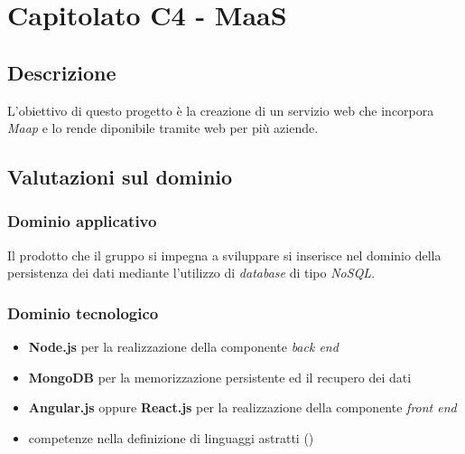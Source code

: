 \section{Capitolato C4 - MaaS}

\subsection{Descrizione}
L'obiettivo di questo progetto \`e la creazione di un servizio web che incorpora \textit{Maap} e lo rende diponibile
tramite web per pi\`u aziende.

\subsection{Valutazioni sul dominio}
\subsubsection{Dominio applicativo}
Il prodotto che il gruppo si impegna a sviluppare si inserisce nel dominio della persistenza dei dati
mediante l'utilizzo di \textit{database} %
di tipo \textit{NoSQL}. %

\subsubsection{Dominio tecnologico}
\begin{itemize}
  \item \textbf{Node.js} per la realizzazione della componente \textit{back end} %
  \item \textbf{MongoDB} per la memorizzazione persistente ed il recupero dei dati %
  \item \textbf{Angular.js} oppure \textbf{React.js} per la realizzazione della componente \textit{front end} %
  \item competenze nella definizione di linguaggi astratti ()
\end{itemize}


